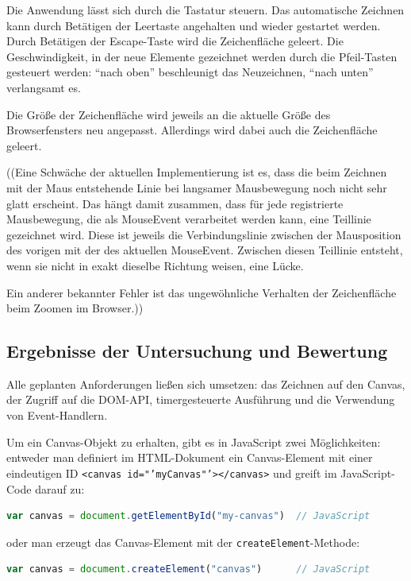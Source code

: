 \documentclass[a4paper, 12pt, hidelinks, listof=totoc, listoftables=totoc, bibliography=totoc]{scrreprt}
\begin{document}
Die Anwendung lässt sich durch die Tastatur steuern. Das automatische Zeichnen kann durch Betätigen der Leertaste angehalten und wieder gestartet werden. Durch Betätigen der Escape-Taste wird die Zeichenfläche geleert. Die Geschwindigkeit, in der neue Elemente gezeichnet werden durch die Pfeil-Tasten gesteuert werden: "`nach oben"' beschleunigt das Neuzeichnen, "`nach unten"' verlangsamt es.

Die Größe der Zeichenfläche wird jeweils an die aktuelle Größe des Browserfensters neu angepasst. Allerdings wird dabei auch die Zeichenfläche geleert.

((Eine Schwäche der aktuellen Implementierung ist es, dass die beim Zeichnen mit der Maus entstehende Linie bei langsamer Mausbewegung noch nicht sehr glatt erscheint. Das hängt damit zusammen, dass für jede registrierte Mausbewegung, die als MouseEvent verarbeitet werden kann, eine Teillinie gezeichnet wird. Diese ist jeweils die Verbindungslinie zwischen der Mausposition des vorigen mit der des aktuellen MouseEvent. Zwischen diesen Teillinie entsteht, wenn sie nicht in exakt dieselbe Richtung weisen, eine Lücke.

Ein anderer bekannter Fehler ist das ungewöhnliche Verhalten der Zeichenfläche beim Zoomen im Browser.))


\subsection{Ergebnisse der Untersuchung und Bewertung}

Alle geplanten Anforderungen ließen sich umsetzen: das Zeichnen auf den Canvas, der Zugriff auf die DOM-API, timergesteuerte Ausführung und die Verwendung von Event-Handlern.

Um ein Canvas-Objekt zu erhalten, gibt es in JavaScript zwei Möglichkeiten: entweder man definiert im HTML-Dokument ein Canvas-Element mit einer eindeutigen ID \texttt{<canvas id="'myCanvas"'></canvas>} und greift im JavaScript-Code darauf zu:

\begin{lstlisting}[language=JavaScript]
var canvas = document.getElementById("my-canvas")  // JavaScript
\end{lstlisting}

oder man erzeugt das Canvas-Element mit der \texttt{createElement}-Methode:

\begin{lstlisting}[language=JavaScript]
var canvas = document.createElement("canvas")      // JavaScript
\end{lstlisting}
\end{document}
